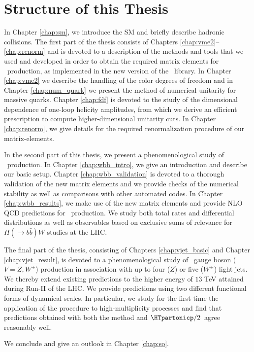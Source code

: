 \section{Structure of this Thesis}
\label{se:structure}
In Chapter \ref{chap:sm}, we introduce the SM and briefly
describe hadronic collisions. The first part of the thesis consists
of Chapters \ref{chap:vme2}\nobreakdash--\ref{chap:renorm} and is
devoted to a description of the methods and
tools that we used and developed in order to obtain the required matrix elements for
\Wbbn~production, as implemented in the new version of the \BlackHat~library. In Chapter \ref{chap:vme2} we describe the
handling of the color degrees of freedom and in Chapter
\ref{chap:num_quark} we present the method of numerical
unitarity for massive quarks. Chapter \ref{chap:fdf} is devoted
to the study of the dimensional dependence of one-loop helicity
amplitudes, from which we derive an efficient prescription to compute
higher-dimensional unitarity cuts. In Chapter
  \ref{chap:renorm}, we give details for the required renormalization
  procedure of our matrix-elements.


In the second part of this thesis, we present a phenomenological study
of \Wbbn~production. In Chapter \ref{chap:wbb_intro}, we give an
introduction and describe our basic setup. Chapter
\ref{chap:wbb_validation} is devoted to a thorough validation of the
new matrix elements and we provide checks of the numerical stability
as well as comparisons with other automated codes. In Chapter
\ref{chap:wbb_results}, we make use of the new matrix elements and
provide NLO QCD predictions for \Wbbn~production. We study both total
rates and differential distributions as well as observables based on
exclusive sums of relevance for $H(\rightarrow b\bar{b})W$ studies at the LHC.

The final part of the thesis, consisting of Chapters
  \ref{chap:vjet_basic} and Chapter \ref{chap:vjet_result}, is
devoted to a phenomenological study of \ew~gauge boson ($V=Z,W^\pm$) production
in association with up to four ($Z$) or five ($W^\pm$) light jets. We
thereby extend existing predictions to the higher energy of $13$ TeV
attained during Run-II of the LHC. We provide predictions using two
different functional forms of dynamical scales. In particular, we
study for the first time the application of the \MINLO{} procedure to
high-multiplicity processes and find that predictions obtained with
both the \MINLO{} method and $\HTpartonicp/2$~agree reasonably well. 

We conclude and
give an outlook in Chapter \ref{chap:so}.
